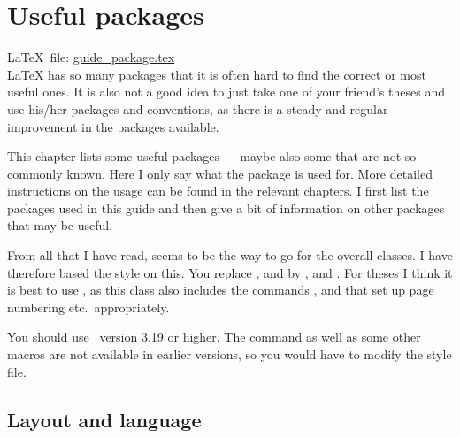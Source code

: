 
\chapter{Useful packages}%
\label{sec:package}

\LaTeX\ file: \href{run:./guide_package.tex}{guide\_package.tex}\\[1ex]
\noindent
\LaTeX{} has so many packages that it is often hard to find the
correct or most useful ones. It is also not a good idea to just take
one of your friend's theses and use his/her packages and conventions,
as there is a steady and regular improvement in the packages
available.

This chapter lists some useful packages --- maybe also some that
are not so commonly known. Here I only say what the package is used
for. More detailed instructions on the usage can be found in the
relevant chapters. I first list the packages used in this guide
and then give a bit of information on other packages that may be useful.

From all that I have read, \KOMAScript{}
seems to be the way to go for the overall classes. I have therefore
based the  style on this. You replace
,  and  by
,  and . For
theses I think it is best to use , as this class also
includes the commands ,  and
 that set up page numbering etc.\ appropriately.

You should use \KOMAScript\ version 3.19 or higher. The
 command as well as some other macros are not available in earlier versions,
so you would have to modify the style file.


\section{Layout and language}%
\label{sec:package:layout}

